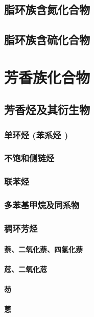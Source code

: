 \documentclass[UTF8]{../03-Chemistry}
\begin{document}
\section{脂环族含氮化合物}
\section{脂环族含硫化合物}










\chapter{芳香族化合物}
\section{芳香烃及其衍生物}
    \subsection{单环烃 (苯系烃 )}
    \subsection{不饱和侧链烃}
    \subsection{联苯烃}
    \subsection{多苯基甲烷及同系物}
    \subsection{稠环芳烃}
        \subsubsection{萘、二氧化萘、四氢化萘}
        \subsubsection{苊、二氧化苊}
        \subsubsection{芴}
        \subsubsection{蒽}
\end{document}
